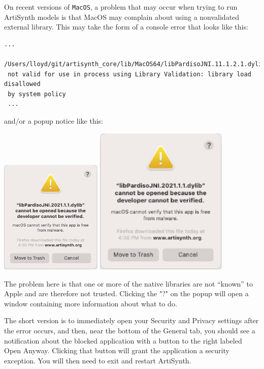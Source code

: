 \documentclass{article}
\begin{document}
On recent versions of {\tt MacOS}, a problem that may occur when trying to run
ArtiSynth models is that MacOS may complain about using a nonvalidated external
library. This may take the form of a console error that looks like this:
%
\begin{lstlisting}[]
 ...
 /Users/lloyd/git/artisynth_core/lib/MacOS64/libPardisoJNI.11.1.2.1.dylib)
 not valid for use in process using Library Validation: library load disallowed
 by system policy 
 ...
\end{lstlisting}
%
and/or a popup notice like this:
\begin{center}
\iflatexml
  \includegraphics[]{images/MacSecurityNotice}
\else
  \includegraphics[width=2.5in]{images/MacSecurityNotice}
\fi
\end{center}
The problem here is that one or more of the native libraries are not ``known''
to Apple and are therefore not trusted. Clicking the "?" on the popup will
open a window containing more information about what to do.

The short version is to immediately open your Security and Privacy
settings after the error occurs, and then, near the bottom of the {\sf
General} tab, you should see a notification about the blocked
application with a button to the right labeled {\sf Open
Anyway}. Clicking that button will grant the application a security
exception. You will then need to exit and restart ArtiSynth.
\end{document}
